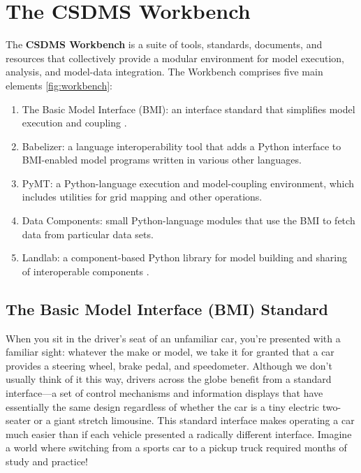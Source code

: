\documentclass[12pt]{amsart}
\begin{document}
\section{The CSDMS Workbench}
\label{sec:workbench}

The \textbf{CSDMS Workbench} is a suite of tools, standards, documents, and resources that collectively provide a modular environment for model execution, analysis, and model-data integration. The Workbench comprises five main elements \ref{fig:workbench}: 
\begin{enumerate}
    \item The Basic Model Interface (BMI): an interface standard that simplifies model execution and coupling \citep{hutton2020basic}.
    \item Babelizer: a language interoperability tool that adds a Python interface to BMI-enabled model programs written in various other languages.
    \item PyMT: a Python-language execution and model-coupling environment, which includes utilities for grid mapping and other operations.
    \item Data Components: small Python-language modules that use the BMI to fetch data from particular data sets.
    \item Landlab: a component-based Python library for model building and sharing of interoperable components \citep{hobley2017creative,barnhart2020short}.
\end{enumerate}

\subsection{The Basic Model Interface (BMI) Standard}




When you sit in the driver's seat of an unfamiliar car,
you're presented with a familiar sight:
whatever the make or model,
we take it for granted that a car provides
a steering wheel, brake pedal, and speedometer.
Although we don't usually think of it this way,
drivers across the globe benefit
from a standard interface---a set of control mechanisms and information displays
that have %
essentially the same design
regardless of whether the car
is a tiny electric two-seater or a giant stretch limousine.
This standard interface makes operating a car much easier
than if each vehicle presented a radically different interface.
Imagine a world where switching from a sports car to a pickup truck
required months of study and practice!
\end{document}
